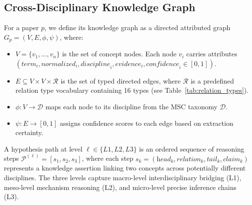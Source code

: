 


\subsection{Cross-Disciplinary Knowledge Graph}

\begin{definition}
For a paper $p$, we define its knowledge graph as a directed attributed graph $G_p = (V, E, \phi, \psi)$, where:
\begin{itemize}
    \item $V = \{v_1, \ldots, v_n\}$ is the set of concept nodes. Each node $v_i$ carries attributes $(\textit{term}_i, \textit{normalized}_i, \textit{discipline}_i, \textit{evidence}_i, \textit{confidence}_i \in [0,1])$.
    \item $E \subseteq V \times V \times \mathcal{R}$ is the set of typed directed edges, where $\mathcal{R}$ is a predefined relation type vocabulary containing 16 types (see Table~\ref{tab:relation_types}).
    \item $\phi: V \to \mathcal{D}$ maps each node to its discipline from the MSC taxonomy $\mathcal{D}$.
    \item $\psi: E \to [0,1]$ assigns confidence scores to each edge based on extraction certainty.
\end{itemize}
\end{definition}

\begin{definition}
A hypothesis path at level $\ell \in \{L1, L2, L3\}$ is an ordered sequence of reasoning steps $\mathcal{P}^{(\ell)} = [s_1, s_2, s_3]$, where each step $s_k = (\textit{head}_k, \textit{relation}_k, \textit{tail}_k, \textit{claim}_k)$ represents a knowledge assertion linking two concepts across potentially different disciplines. The three levels capture macro-level interdisciplinary bridging (L1), meso-level mechanism reasoning (L2), and micro-level precise inference chains (L3).
\end{definition}


